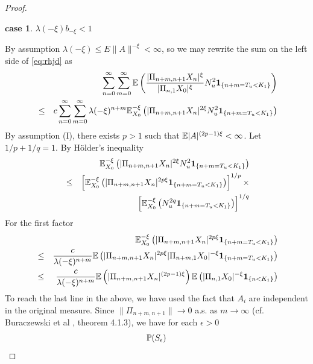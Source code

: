 \documentclass[aoas,preprint]{imsart}
\newtheorem{case}{case}
\numberwithin{equation}{section}
\theoremstyle{plain}
\begin{document}
\begin{proof}
\begin{case}
    $\lambda(-\xi) b_{-\xi} < 1$
  \end{case}
  By assumption $\lambda(-\xi) \leq E\|A\|^{-\xi} < \infty$, so
  we may rewrite the sum on the left side of \eqref{eq:rhjd} as
  \begin{eqnarray}
    &&
    \sum_{n=0}^\infty
    \sum_{m=0}^\infty
    \E \left(
      {
        | \Pi_{n+m,n+1} X_n |^{\xi}
        \over
        | \Pi_{n,1} X_0 |^{\xi}
      }
      N_u^2
      \1{n+m = T_u < K_1}
    \right) \label{eq:kpdf} \\
    &\leq&
    c
    \sum_{n=0}^\infty
    \sum_{m=0}^\infty
    \lambda(-\xi)^{n+m}
    \E_{X_0}^{-\xi} \left(
      | \Pi_{n+m,n+1} X_n |^{2 \xi}
      N_u^2
      \1{n+m = T_u < K_1}
    \right) \nonumber
  \end{eqnarray}
  By assumption (I), there exists $p > 1$ such that
  $\E |A|^{(2p - 1)\xi} < \infty$. Let $1/p + 1/q = 1$. By
  H\"older's inequality
  \begin{eqnarray}
    &&
    \E_{X_0}^{-\xi} \left(
      | \Pi_{n+m,n+1} X_n |^{2 \xi}
      N_u^2
      \1{n+m = T_u < K_1}
    \right)  \label{eq:hyyu} \\
    &\leq&
    \left[
      \E_{X_0}^{-\xi} \left(
        | \Pi_{n+m,n+1} X_n|^{2 p\xi}
        \1{n+m = T_u < K_1}
      \right)
    \right]^{1/p} \nonumber \times \\
    &&
    \left[
      \E_{X_0}^{-\xi} \left(
        N_u^{2q}
        \1{n+m = T_u < K_1}
      \right)
    \right]^{1/q}
    \nonumber
  \end{eqnarray}
  For the first factor
  \begin{eqnarray}
    &&
    \E_{X_0}^{-\xi} \left(
      | \Pi_{n+m,n+1} X_n|^{2 p\xi}
      \1{n+m = T_u < K_1}
    \right) \label{eq:hfry} \\
    &\leq&
    {c \over \lambda(-\xi)^{n+m}}
    \E \left(
      |\Pi_{n+m,n+1} X_n|^{2p\xi}
      |\Pi_{n+m, 1} X_{0}|^{-\xi}
      \1{n+m = T_u < K_1}
    \right) \nonumber \\
    &\leq&
    {c \over \lambda(-\xi)^{n+m}}
    \E \left(
      |\Pi_{n+m,n+1} X_n|^{(2p-1)\xi}
    \right)
    \E \left(
      |\Pi_{n,1} X_0|^{-\xi}
      \1{n < K_1}
    \right) \nonumber
  \end{eqnarray}
  To reach the last line in the above, we have used the fact that
  $A_i$ are independent in the original measure.
  Since $\| \Pi_{n+m,n+1} \| \to 0$ a.s. as $m \to \infty$
  (cf. Buraczewski et al \cite{buraczewski:damek:mikosch:2016},
  theorem 4.1.3), we have for each $\epsilon > 0$
  \[
  \P(S_\epsilon)
\]
\end{proof}
\end{document}

